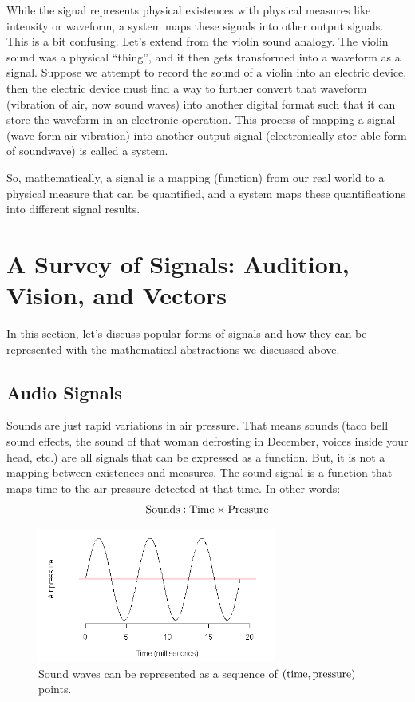 While the signal represents physical existences with physical measures like intensity or waveform, a system maps these signals into other output signals.
This is a bit confusing. Let's extend from the violin sound analogy.
The violin sound was a physical ``thing'', and it then gets transformed into a waveform as a signal.
Suppose we attempt to record the sound of a violin into an electric device, then the electric device must find a way to further convert that waveform (vibration of air, now sound waves) into another digital format such that it can store the waveform in an electronic operation.
This process of mapping a signal (wave form air vibration) into another output signal (electronically stor-able form of soundwave) is called a system.

So, mathematically, a signal is a mapping (function) from our real world to a physical measure that can be quantified, and a system maps these quantifications into different signal results.

\section{A Survey of Signals: Audition, Vision, and Vectors}
In this section, let's discuss popular forms of signals and how they can be represented with the mathematical abstractions we discussed above.

\subsection{Audio Signals}
Sounds are just rapid variations in air pressure.
That means sounds (taco bell sound effects, the sound of that woman defrosting in December, voices inside your head, etc.) are all signals that can be expressed as a function.
But, it is not a mapping between existences and measures. The sound signal is a function that maps time to the air pressure detected at that time. In other words:
\[
    {\rm Sounds}: {\rm Time} \times {\rm Pressure}
\]

\begin{center}
    \begin{figure}[h]
        \centering
        \includegraphics[width=0.7\textwidth]{figs/ln03/sound-time-pressure.png}
        \caption{Sound waves can be represented as a sequence of $({\rm time}, {\rm pressure})$ points.}
    \end{figure}
\end{center}

